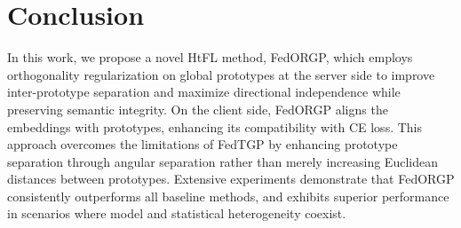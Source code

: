 \section{Conclusion}
\label{sec:conclusion}

In this work, we propose a novel HtFL method, FedORGP, which employs orthogonality regularization on global prototypes at the server side to improve inter-prototype separation and maximize directional independence while preserving semantic integrity. On the client side, FedORGP aligns the embeddings with prototypes, enhancing its compatibility with CE loss. This approach overcomes the limitations of FedTGP by enhancing prototype separation through angular separation rather than merely increasing Euclidean distances between prototypes. Extensive experiments demonstrate that FedORGP consistently outperforms all baseline methods, and exhibits superior performance in scenarios where model and statistical heterogeneity coexist.